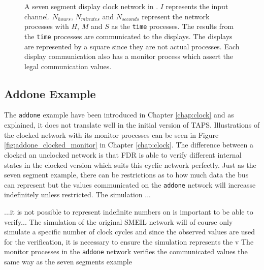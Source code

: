 \begin{figure}[!ht]
  \caption{A seven segment display clock network in \cspm{}. $I$ represents the input channel. $N_{hours}$, $N_{minutes}$ and $N_{seconds}$ represent the network processes with $H$, $M$ and $S$ as the \texttt{time} processes. The results from the \texttt{time} processes are communicated to the displays. The displays are represented by a square since they are not actual \cspm{} processes. Each display communication also has a monitor process which assert the legal communication values.}
  \label{fig:cspm-network}
\end{figure}


\subsection{Addone Example}
The \texttt{addone} example have been introduced in Chapter \ref{chap:clock} and as explained, it does not translate well in the initial version of TAPS. Illustrations of the clocked network with its monitor processes can be seen in Figure \ref{fig:addone_clocked_monitor} in Chapter \ref{chap:clock}.
The difference between a clocked an unclocked network is that FDR is able to verify different internal states in the clocked version which suits this cyclic network perfectly. Just as the seven segment example, there can be restrictions as to how much data the bus can represent but the values communicated on the \texttt{addone} network will increasse indefinitely unless restricted. The simulation ...

...it is not possible to represent indefinite numbers on is important to be able to verify...
The simulation of the original SMEIL network will of course only simulate a specific number of clock cycles and since the observed values are used for the verification, it is necessary to ensure the simulation represents the v
The monitor processes in the \texttt{addone} network verifies the communicated values the same way as the seven segments example


